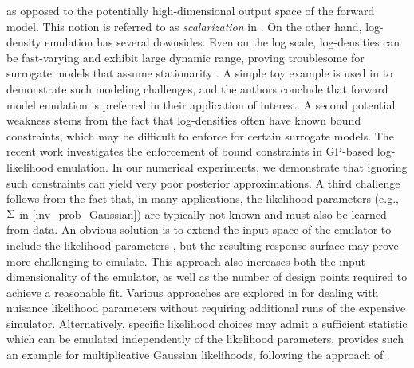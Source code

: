 \documentclass[12pt]{article}
\begin{document}
as opposed to the potentially high-dimensional output space of the forward model. This notion is referred 
to as \textit{scalarization} in \citet{ranjan2016inverse, trainDynamics}.
On the other hand, log-density emulation has several downsides. Even on the log scale, log-densities can be fast-varying and 
exhibit large dynamic range, proving troublesome for surrogate models that assume stationarity \cite{wang2018adaptive}.
A simple toy example is used in \citep{Surer2023sequential} to demonstrate such modeling challenges, and the 
authors conclude that forward model emulation is preferred in their application of interest. A second potential weakness 
stems from the fact that log-densities often have known bound constraints, which may be difficult to enforce 
for certain surrogate models. The recent work \citet{quantileApprox} investigates the enforcement of 
bound constraints in GP-based log-likelihood emulation. In our numerical experiments, we demonstrate that ignoring
such constraints can yield very poor posterior approximations. A third challenge follows from the fact that, in many applications, 
the likelihood parameters (e.g., $\Sigma$ in \cref{inv_prob_Gaussian}) are typically not known and must also be 
learned from data. An obvious solution is to extend the input space of the emulator to include the likelihood parameters
\citep{llikRBF,emPostDens}, but the resulting response surface may prove more challenging to emulate. This approach also increases both the 
input dimensionality of the emulator, as well as the number of design points required to achieve 
a reasonable fit. Various approaches are explored in \citet{llikRBF} for dealing with nuisance likelihood parameters
without requiring additional runs of the expensive simulator. Alternatively, specific likelihood 
choices may admit a sufficient statistic which can be emulated independently of the likelihood parameters. 
 provides such an example for multiplicative Gaussian likelihoods, following the 
approach of \citet{FerEmulation}.
\end{document}
